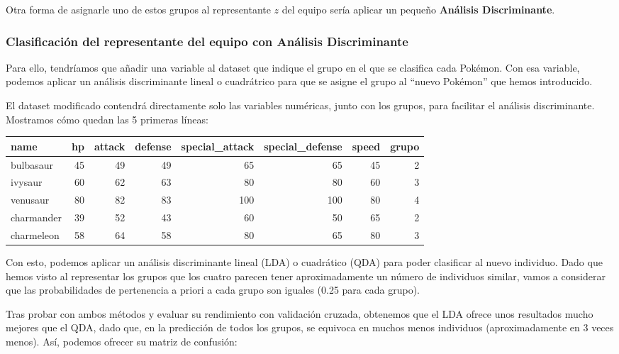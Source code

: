 \documentclass[
  12pt,
]{extreport}
\begin{document}
Otra forma de asignarle uno de estos grupos al representante \(z\) del
equipo sería aplicar un pequeño \textbf{Análisis Discriminante}.

\subsubsection{Clasificación del representante del equipo con Análisis
Discriminante}\label{clasificaciuxf3n-del-representante-del-equipo-con-anuxe1lisis-discriminante}

Para ello, tendríamos que añadir una variable al dataset que indique el
grupo en el que se clasifica cada Pokémon. Con esa variable, podemos
aplicar un análisis discriminante lineal o cuadrátrico para que se
asigne el grupo al ``nuevo Pokémon'' que hemos introducido.

El dataset modificado contendrá directamente solo las variables
numéricas, junto con los grupos, para facilitar el análisis
discriminante. Mostramos cómo quedan las 5 primeras líneas:

\begin{table}[H]
\centering\begingroup\fontsize{11.5}{13.5}\selectfont

\begin{tabular}{lrrrrrrr}
\toprule
name & hp & attack & defense & special\_attack & special\_defense & speed & grupo\\
\midrule
bulbasaur & 45 & 49 & 49 & 65 & 65 & 45 & 2\\
ivysaur & 60 & 62 & 63 & 80 & 80 & 60 & 3\\
venusaur & 80 & 82 & 83 & 100 & 100 & 80 & 4\\
charmander & 39 & 52 & 43 & 60 & 50 & 65 & 2\\
charmeleon & 58 & 64 & 58 & 80 & 65 & 80 & 3\\
\bottomrule
\end{tabular}
\endgroup{}
\end{table}

Con esto, podemos aplicar un análisis discriminante lineal (LDA) o
cuadrático (QDA) para poder clasificar al nuevo individuo. Dado que
hemos visto al representar los grupos que los cuatro parecen tener
aproximadamente un número de individuos similar, vamos a considerar que
las probabilidades de pertenencia a priori a cada grupo son iguales
(0.25 para cada grupo).

Tras probar con ambos métodos y evaluar su rendimiento con validación
cruzada, obtenemos que el LDA ofrece unos resultados mucho mejores que
el QDA, dado que, en la predicción de todos los grupos, se equivoca en
muchos menos individuos (aproximadamente en 3 veces menos). Así, podemos
ofrecer su matriz de confusión:
\end{document}
